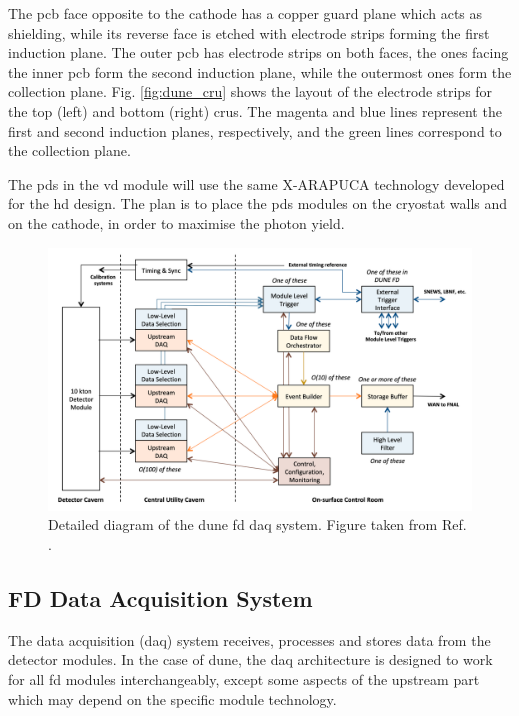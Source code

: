 The \gls{pcb} face opposite to the cathode has a copper guard plane which acts as shielding, while its reverse face is etched with electrode strips forming the first induction plane. The outer \gls{pcb} has electrode strips on both faces, the ones facing the inner \gls{pcb} form the second induction plane, while the outermost ones form the collection plane. Fig. \ref{fig:dune_cru} shows the layout of the electrode strips for the top (left) and bottom (right) \gls{cru}s. The magenta and blue lines represent the first and second induction planes, respectively, and the green lines correspond to the collection plane.

The \gls{pds} in the \gls{vd} module will use the same X-ARAPUCA technology developed for the \gls{hd} design. The plan is to place the \gls{pds} modules on the cryostat walls and on the cathode, in order to maximise the photon yield.


\begin{figure}[t]
	\centering
	\includegraphics[width=0.8\linewidth]{Images/DUNE/FD/DAQ_detailed2}
	\caption[Detailed diagram of the \gls{dune} \gls{fd} \gls{daq} system.]{Detailed diagram of the \gls{dune} \gls{fd} \gls{daq} system. Figure taken from Ref. \cite{DUNE2020TDR4}.}
	\label{fig:daq1}
\end{figure}

\subsection{FD Data Acquisition System}

The data acquisition (\gls{daq}) system receives, processes and stores data from the detector modules. In the case of \gls{dune}, the \gls{daq} architecture is designed to work for all \gls{fd} modules interchangeably, except some aspects of the upstream part which may depend on the specific module technology.

